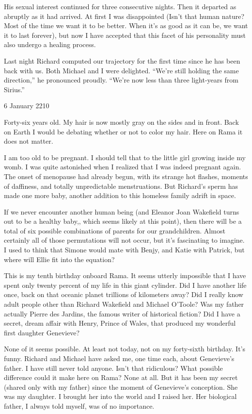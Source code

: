\documentclass[]{article}
\begin{document}
{His sexual interest continued for three consecutive nights. Then it departed as abruptly as it had arrived. At first I was disappointed (Isn’t that human nature? Most of the time we want it to be better. When it’s as good as it can be, we want it to last forever), but now I have accepted that this facet of his personality must also undergo a healing process.

Last night Richard computed our trajectory for the first time since he has been back with us. Both Michael and I were delighted. “We’re still holding the same direction,” he pronounced proudly. “We’re now less than three light-years from Sirius.”

6 January 2210

Forty-six years old. My hair is now mostly gray on the sides and in front. Back on Earth I would be debating whether or not to color my hair. Here on Rama it does not matter.

I am too old to be pregnant. I should tell that to the little girl growing inside my womb. I was quite astonished when I realized that I was indeed pregnant again. The onset of menopause had already begun, with its strange hot flashes, moments of daffiness, and totally unpredictable menstruations. But Richard’s sperm has made one more baby, another addition to this homeless family adrift in space.

If we never encounter another human being (and Eleanor Joan Wakefield turns out to be a healthy baby,, which seems likely at this point), then there will be a total of six possible combinations of parents for our grandchildren. Almost certainly all of those permutations will not occur, but it’s fascinating to imagine. I used to think that Simone would mate with Benjy, and Katie with Patrick, but where will Ellie fit into the equation?

This is my tenth birthday onboard Rama. It seems utterly impossible that I have spent only twenty percent of my life in this giant cylinder. Did I have another life once, back on that oceanic planet trillions of kilometers away? Did I really know adult people other than Richard Wakefield and Michael O’Toole? Was my father actually Pierre des Jardins, the famous writer of historical fiction? Did I have a secret, dream affair with Henry, Prince of Wales, that produced my wonderful first daughter Genevieve?

None of it seems possible. At least not today, not on my forty-sixth birthday. It’s funny. Richard and Michael have asked me, one time each, about Genevieve’s father. I have still never told anyone. Isn’t that ridiculous? What possible difference could it make here on Rama? None at all. But it has been my secret (shared only with my father) since the moment of Genevieve’s conception. She was my daughter. I brought her into the world and I raised her. Her biological father, I always told myself, was of no importance.

}
\end{document}

